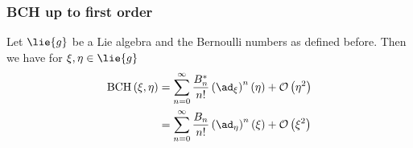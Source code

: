 \subsubsection{BCH up to first order}

\begin{proposition}
	\label{Alg:Prop:BCHFristOrder}
	Let $\lie{g}$ be a Lie algebra and the Bernoulli numbers as defined 
	before. Then we have for $\xi, \eta \in \lie{g}$
	\begin{align}
		\label{Alg:BCHFirstOrderXi}
		\bch{\xi}{\eta}
		& =
		\sum\limits_{n = 0}^{\infty}
		\frac{B_n^*}{n!}
		\left( \ad_{\xi} \right)^n (\eta)
		+ \mathcal{O} \left( \eta^2 \right)
		\\
		\label{Alg:BCHFirstOrderEta}
		& =
		\sum\limits_{n = 0}^{\infty}
		\frac{B_n}{n!}
		\left( \ad_{\eta} \right)^n (\xi)
		+ \mathcal{O} \left( \xi^2 \right)
	\end{align}
\end{proposition}
